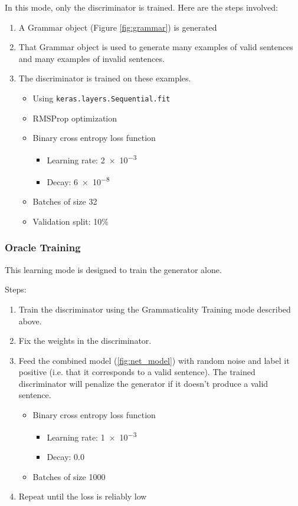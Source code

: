 \documentclass[12pt]{article}
\begin{document}
In this mode, only the discriminator is trained. Here are the steps involved:
\begin{enumerate}
    \item A Grammar object (Figure \ref{fig:grammar}) is generated
    \item That Grammar object is used to generate many examples of valid sentences and many examples of invalid sentences.
    \item The discriminator is trained on these examples.
    \begin{itemize}
        \item Using \texttt{keras.layers.Sequential.fit}
        \item RMSProp optimization
        \item Binary cross entropy loss function
        \begin{itemize}
            \item Learning rate: \num{2e-3}
            \item Decay: \num{6e-8}
        \end{itemize}
        \item Batches of size 32
        \item Validation split: 10\%
    \end{itemize}
\end{enumerate}

\subsubsection{Oracle Training}

This learning mode is designed to train the generator alone.

Steps:
\begin{enumerate}
    \item Train the discriminator using the Grammaticality Training mode described above.
    \item Fix the weights in the discriminator.
    \item Feed the combined model (\ref{fig:net_model}) with random noise and label it positive (i.e. that it corresponds to a valid sentence). The trained discriminator will penalize the generator if it doesn't produce a valid sentence.
    \begin{itemize}
        \item Binary cross entropy loss function
        \begin{itemize}
            \item Learning rate: \num{1e-3}
            \item Decay: \num{0.0}
        \end{itemize}
        \item Batches of size 1000
    \end{itemize}
    \item Repeat until the loss is reliably low
\end{enumerate}
\end{document}
